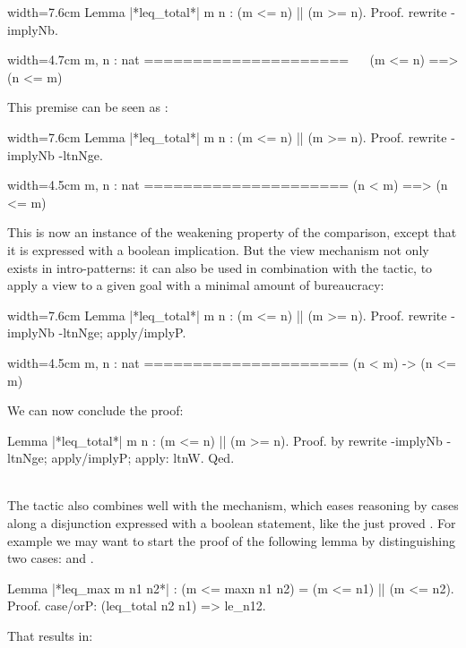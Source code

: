 \begin{coq}{}{width=7.6cm}
Lemma |*leq_total*| m n : (m <= n) || (m >= n).
Proof.
rewrite -implyNb.
\end{coq}
\begin{coqout}{}{width=4.7cm}
m, n : nat
=====================
~~ (m <= n) ==> (n <= m)
\end{coqout}

This premise can be seen as :

\begin{coq}{}{width=7.6cm}
Lemma |*leq_total*| m n : (m <= n) || (m >= n).
Proof.
rewrite -implyNb -ltnNge.
\end{coq}
\begin{coqout}{}{width=4.5cm}
m, n : nat
=====================
(n < m) ==> (n <= m)
\end{coqout}

This is now an instance of the weakening property of the comparison,
except that it is expressed with a boolean implication. But the view
mechanism not only exists in intro-patterns: it can also be used in
combination with the  tactic, to apply a view to a given goal
with a minimal amount of bureaucracy:

\begin{coq}{}{width=7.6cm}
Lemma |*leq_total*| m n : (m <= n) || (m >= n).
Proof.
rewrite -implyNb -ltnNge; apply/implyP.
\end{coq}
\begin{coqout}{}{width=4.5cm}
m, n : nat
=====================
(n < m) -> (n <= m)
\end{coqout}

We can now conclude the proof:

\begin{coq}{}{}
Lemma |*leq_total*| m n : (m <= n) || (m >= n).
Proof. by rewrite -implyNb -ltnNge; apply/implyP; apply: ltnW. Qed.
\end{coq}
\\

The  tactic also combines well with the  mechanism, which
eases reasoning by cases along a disjunction expressed with a boolean
statement, like the just proved .  For example we
may want to start the proof of the following lemma by distinguishing
two cases:  and .

\begin{coq}{}{}
Lemma |*leq_max m n1 n2*| :
  (m <= maxn n1 n2) = (m <= n1) || (m <= n2).
Proof.
case/orP: (leq_total n2 n1) => le_n12.
\end{coq}
That results in:

